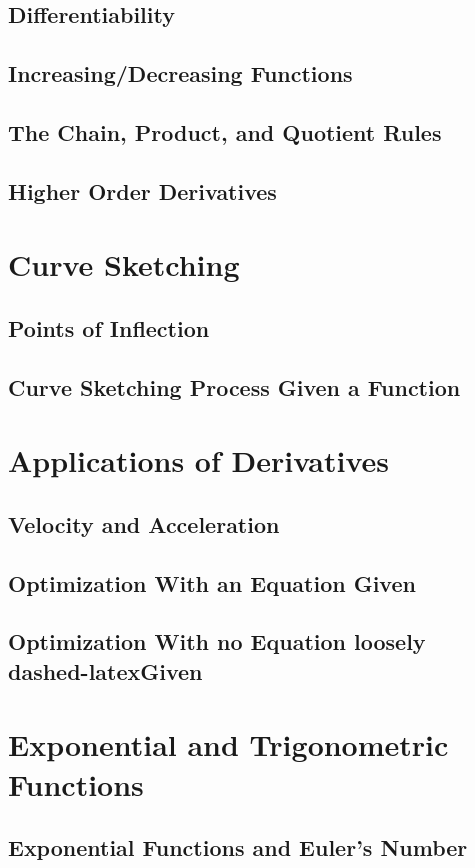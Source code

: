 \documentclass[12.5pt]{article}
\begin{document}
        \subsection{Differentiability}
        \subsection{Increasing/Decreasing Functions}
        \subsection{The Chain, Product, and Quotient Rules}
        \subsection{Higher Order Derivatives}

    \section{Curve Sketching}
        \subsection{Points of Inflection}
        \subsection{Curve Sketching Process Given a Function}
    
    \section{Applications of Derivatives}
        \subsection{Velocity and Acceleration}
        \subsection{Optimization With an Equation Given}
        \subsection{Optimization With no Equation loosely dashed-latexGiven}

    \section{Exponential and Trigonometric Functions}
    \subsection{Exponential Functions and Euler's Number}
\end{document}
